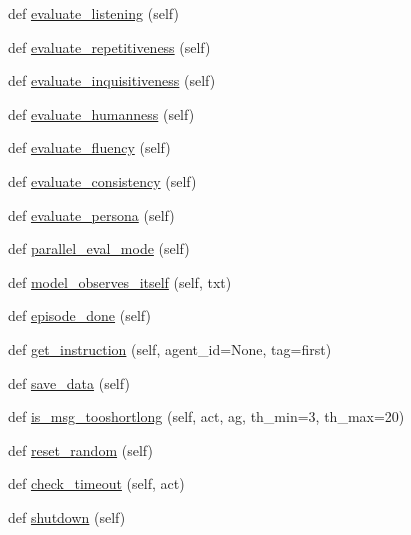 \begin{DoxyCompactItemize}
\item 
def \hyperlink{classmturk_1_1worlds_1_1ControllableDialogEval_a7002b931f1813d4757dc00e67293aa90}{evaluate\+\_\+listening} (self)
\item 
def \hyperlink{classmturk_1_1worlds_1_1ControllableDialogEval_a06569ce7ce50e5bc930bf699c4a70167}{evaluate\+\_\+repetitiveness} (self)
\item 
def \hyperlink{classmturk_1_1worlds_1_1ControllableDialogEval_ae97a45f37f7e71c42ddbf152b4af0861}{evaluate\+\_\+inquisitiveness} (self)
\item 
def \hyperlink{classmturk_1_1worlds_1_1ControllableDialogEval_a0c80a0ddf95145c0a632c07ff7bbe99e}{evaluate\+\_\+humanness} (self)
\item 
def \hyperlink{classmturk_1_1worlds_1_1ControllableDialogEval_a6208c058cb87f311f1362f597af72130}{evaluate\+\_\+fluency} (self)
\item 
def \hyperlink{classmturk_1_1worlds_1_1ControllableDialogEval_ac91833b4ab4b602e102cef3d7a605536}{evaluate\+\_\+consistency} (self)
\item 
def \hyperlink{classmturk_1_1worlds_1_1ControllableDialogEval_aced8844b17899e1cc4c920a72cb490a4}{evaluate\+\_\+persona} (self)
\item 
def \hyperlink{classmturk_1_1worlds_1_1ControllableDialogEval_a06c86b010d4db36333eb3f520dfc926b}{parallel\+\_\+eval\+\_\+mode} (self)
\item 
def \hyperlink{classmturk_1_1worlds_1_1ControllableDialogEval_a3e71aa36c309c8078481261ec0b4bc14}{model\+\_\+observes\+\_\+itself} (self, txt)
\item 
def \hyperlink{classmturk_1_1worlds_1_1ControllableDialogEval_ada3a1f3595c5e3c5aab8438609301d33}{episode\+\_\+done} (self)
\item 
def \hyperlink{classmturk_1_1worlds_1_1ControllableDialogEval_a8792ad92033ef69bb203d7a3574f4343}{get\+\_\+instruction} (self, agent\+\_\+id=None, tag=\textquotesingle{}first\textquotesingle{})
\item 
def \hyperlink{classmturk_1_1worlds_1_1ControllableDialogEval_a06ae5d6d90beaa223da2dcb8ac6597ce}{save\+\_\+data} (self)
\item 
def \hyperlink{classmturk_1_1worlds_1_1ControllableDialogEval_a549992c78140c745d43874d073eb90c1}{is\+\_\+msg\+\_\+tooshortlong} (self, act, ag, th\+\_\+min=3, th\+\_\+max=20)
\item 
def \hyperlink{classmturk_1_1worlds_1_1ControllableDialogEval_aa610ee668d690688e3237d01831e6d69}{reset\+\_\+random} (self)
\item 
def \hyperlink{classmturk_1_1worlds_1_1ControllableDialogEval_ae50fb3e9d6e7657201cbbe932d533a0d}{check\+\_\+timeout} (self, act)
\item 
def \hyperlink{classmturk_1_1worlds_1_1ControllableDialogEval_aa8888a3df7cb8610c0bde2d826557d99}{shutdown} (self)
\end{DoxyCompactItemize}
